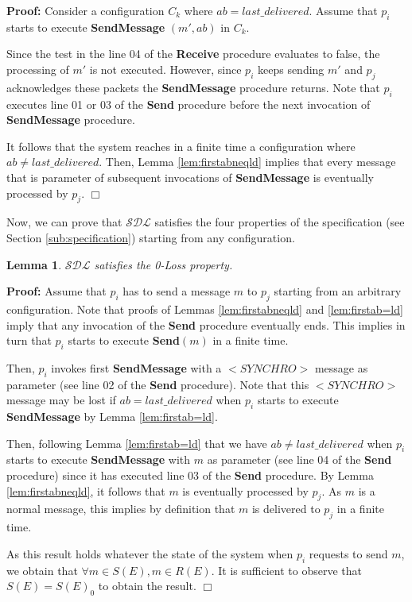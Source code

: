 \documentclass[11pt]{article}
\newtheorem{lemma}{Lemma}
\newenvironment{proof}{\noindent\textbf{Proof:}}{\hfill$\Box$}
\begin{document}
\begin{proof}
Consider a configuration $C_k$ where $ab=last\_delivered$. Assume that $p_i$ starts to execute \textbf{SendMessage} $(m',ab)$ in $C_k$.

Since the test in the line 04 of the \textbf{Receive} procedure evaluates to false, the processing of $m'$ is not executed. However, since $p_i$ keeps sending $m'$ and $p_j$ acknowledges these packets the \textbf{SendMessage} procedure returns. Note that $p_i$ executes line 01 or 03 of the \textbf{Send} procedure before the next invocation of \textbf{SendMessage} procedure.
 
It follows that the system reaches in a finite time a configuration where $ab \neq last\_delivered$. Then, Lemma \ref{lem:firstabneqld} implies that every message that is parameter of subsequent invocations of \textbf{SendMessage} is eventually processed by $p_j$. 
\end{proof}

Now, we can prove that $\mathcal{SDL}$ satisfies the four properties of the specification (see Section \ref{sub:specification}) starting from any configuration.

\begin{lemma}\label{lem:loss}
$\mathcal{SDL}$ satisfies the 0-Loss property.
\end{lemma}

\begin{proof}
Assume that $p_i$ has to send a message $m$ to $p_j$ starting from an arbitrary configuration. Note that proofs of Lemmas \ref{lem:firstabneqld} and \ref{lem:firstab=ld} imply that any invocation of the \textbf{Send} procedure eventually ends. This implies in turn that $p_i$ starts to execute \textbf{Send}$(m)$ in a finite time. 

Then, $p_i$ invokes first \textbf{SendMessage} with a $<SYNCHRO>$ message as parameter (see line 02 of the \textbf{Send} procedure). Note that this $<SYNCHRO>$ message may be lost if $ab=last\_delivered$ when $p_i$ starts to execute \textbf{SendMessage} by Lemma \ref{lem:firstab=ld}. 

Then, following Lemma \ref{lem:firstab=ld} that we have $ab\neq last\_delivered$ when $p_i$ starts to execute \textbf{SendMessage} with $m$ as parameter (see line 04 of the \textbf{Send} procedure) since it has executed line 03 of the \textbf{Send} procedure. By Lemma \ref{lem:firstabneqld}, it follows that $m$ is eventually processed by $p_j$. As $m$ is a normal message, this implies by definition that $m$ is delivered to $p_j$ in a finite time.

As this result holds whatever the state of the system when $p_i$ requests to send $m$, we obtain that $\forall m\in S(E), m\in R(E)$. It is sufficient to observe that $S(E)=S(E)_0$ to obtain the result.
\end{proof}
\end{document}
